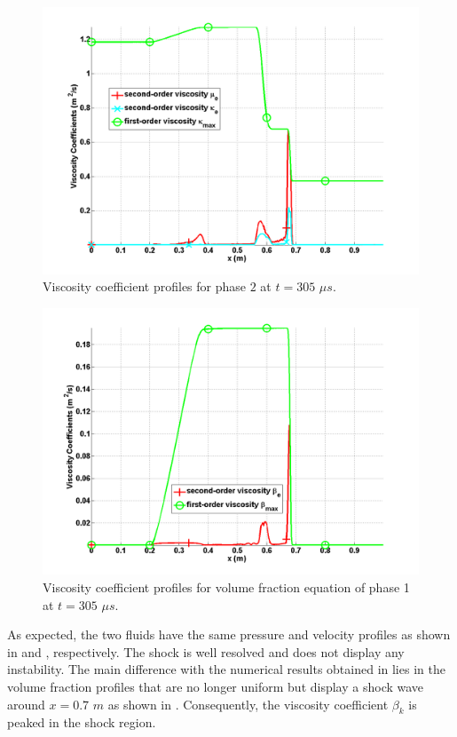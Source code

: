 \begin{figure}[H]
\centering
\includegraphics[width=\textwidth]{figures/SEM/relaxation_two_phases_vapor_viscosity_kappa_mu.png}
\caption{Viscosity coefficient profiles for phase $2$ at $t=305$ $\mu s$.}
\label{fig:two-fluids-rel-visc-1-7-eqn-sect4}
\end{figure}
%
\begin{figure}[H]
\centering
\includegraphics[width=\textwidth]{figures/SEM/relaxation_two_phases_liquid_beta.png}
\caption{Viscosity coefficient profiles for volume fraction equation of phase 1 at $t=305$ $\mu s$.}
\label{fig:two-fluids-rel-vf-visc-1-7-eqn-sect4}
\end{figure}
%
As expected, the two fluids have the same pressure and velocity profiles as shown in  and , respectively. The shock is well resolved and does not display any instability. The main difference with the numerical results obtained in  lies in the volume fraction profiles that are no longer uniform but display a shock wave around $x=0.7$ $m$ as shown in . Consequently, the viscosity coefficient $\beta_k$ is peaked in the shock region.  
